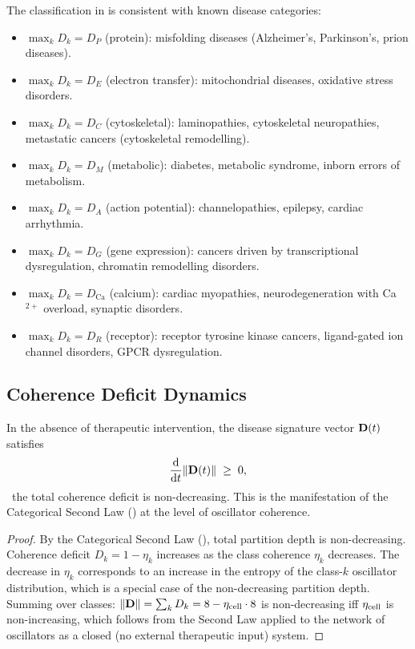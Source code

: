 The classification in  is consistent with known
disease categories:
\begin{itemize}[noitemsep]
    \item $\max_k D_k = D_P$ (protein): misfolding diseases (Alzheimer's,
          Parkinson's, prion diseases).
    \item $\max_k D_k = D_E$ (electron transfer): mitochondrial diseases,
          oxidative stress disorders.
    \item $\max_k D_k = D_C$ (cytoskeletal): laminopathies, cytoskeletal
          neuropathies, metastatic cancers (cytoskeletal remodelling).
    \item $\max_k D_k = D_M$ (metabolic): diabetes, metabolic syndrome,
          inborn errors of metabolism.
    \item $\max_k D_k = D_A$ (action potential): channelopathies, epilepsy,
          cardiac arrhythmia.
    \item $\max_k D_k = D_G$ (gene expression): cancers driven by transcriptional
          dysregulation, chromatin remodelling disorders.
    \item $\max_k D_k = D_\mathrm{Ca}$ (calcium): cardiac myopathies,
          neurodegeneration with Ca$^{2+}$ overload, synaptic disorders.
    \item $\max_k D_k = D_R$ (receptor): receptor tyrosine kinase cancers,
          ligand-gated ion channel disorders, GPCR dysregulation.
\end{itemize}

\subsection{Coherence Deficit Dynamics}

\begin{theorem}
\label{thm:monotone-disease}
In the absence of therapeutic intervention, the disease signature vector
$\mathbf{D}(t)$ satisfies
\begin{equation}
    \frac{\mathrm{d}}{\mathrm{d}t} \|\mathbf{D}(t)\| \;\ge\; 0,
\end{equation}
\ie\ the total coherence deficit is non-decreasing.  This is the manifestation
of the Categorical Second Law () at the level of
oscillator coherence.
\end{theorem}

\begin{proof}
By the Categorical Second Law (), total partition depth
is non-decreasing.  Coherence deficit $D_k = 1 - \eta_k$ increases as
the class coherence $\eta_k$ decreases.  The decrease in $\eta_k$ corresponds
to an increase in the entropy of the class-$k$ oscillator distribution, which
is a special case of the non-decreasing partition depth.  Summing over classes:
$\|\mathbf{D}\| = \sum_k D_k = 8 - \eta_{\mathrm{cell}} \cdot 8$ is non-decreasing iff
$\eta_{\mathrm{cell}}$ is non-increasing, which follows from the Second Law applied to
the network of oscillators as a closed (no external therapeutic input) system.
\end{proof}

